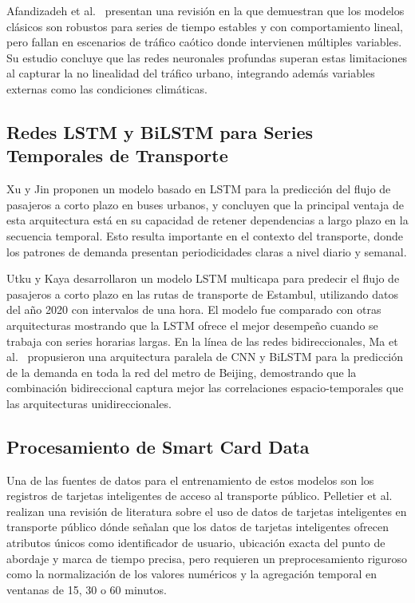 \documentclass[preprint,12pt]{elsarticle}
\begin{document}
Afandizadeh et al.\ \cite{afandizadeh2024} presentan una revisión en la que demuestran que los modelos clásicos son robustos para series de tiempo estables y con comportamiento lineal, pero fallan en escenarios de tráfico caótico donde intervienen múltiples variables. Su estudio concluye que las redes neuronales profundas superan estas limitaciones al capturar la no linealidad del tráfico urbano, integrando además variables externas como las condiciones climáticas.

\subsection{Redes LSTM y BiLSTM para Series Temporales de Transporte}

Xu y Jin \cite{xu2021} proponen un modelo basado en LSTM para la predicción del flujo de pasajeros a corto plazo en buses urbanos, y concluyen que la principal ventaja de esta arquitectura está en su capacidad de retener dependencias a largo plazo en la secuencia temporal. Esto resulta importante en el contexto del transporte, donde los patrones de demanda presentan periodicidades claras a nivel diario y semanal.

Utku y Kaya \cite{utku2023} desarrollaron un modelo LSTM multicapa para predecir el flujo de pasajeros a corto plazo en las rutas de transporte de Estambul, utilizando datos del año 2020 con intervalos de una hora. El modelo fue comparado con otras arquitecturas mostrando que la LSTM ofrece el mejor desempeño cuando se trabaja con series horarias largas. En la línea de las redes bidireccionales, Ma et al.\ \cite{ma2018} propusieron una arquitectura paralela de CNN y BiLSTM para la predicción de la demanda en toda la red del metro de Beijing, demostrando que la combinación bidireccional captura mejor las correlaciones espacio-temporales que las arquitecturas unidireccionales.

\subsection{Procesamiento de Smart Card Data}

Una de las fuentes de datos para el entrenamiento de estos modelos son los registros de tarjetas inteligentes de acceso al transporte público. Pelletier et al.\ \cite{pelletier2011} realizan una revisión de literatura sobre el uso de datos de tarjetas inteligentes en transporte público dónde señalan que los datos de tarjetas inteligentes ofrecen atributos únicos como identificador de usuario, ubicación exacta del punto de abordaje y marca de tiempo precisa, pero requieren un preprocesamiento riguroso como la normalización de los valores numéricos y la agregación temporal en ventanas de 15, 30 o 60 minutos.
\end{document}
